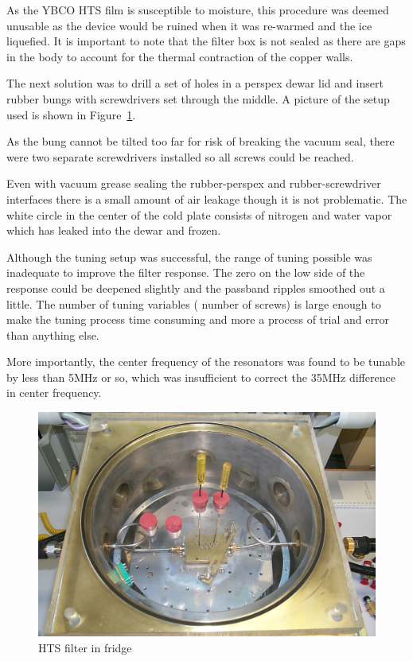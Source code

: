 As the YBCO HTS film is susceptible to moisture, this procedure was deemed unusable as the device would be ruined when it was re-warmed and the ice liquefied. It is important to note that the filter box is not sealed as there are gaps in the body to account for the thermal contraction of the copper walls.

The next solution was to drill a set of holes in a perspex dewar lid and insert rubber bungs with screwdrivers set through the middle. A picture of the setup used is shown in Figure~\ref{figure:test-hts-fridge}.

As the bung cannot be tilted too far for risk of breaking the vacuum seal, there were two separate screwdrivers installed so all screws could be reached.

Even with vacuum grease sealing the rubber-perspex and rubber-screwdriver interfaces there is a small amount of air leakage though it is not problematic. The white circle in the center of the cold plate consists of nitrogen and water vapor which has leaked into the dewar and frozen.

Although the tuning setup was successful, the range of tuning possible was inadequate to improve the filter response. The zero on the low side of the response could be deepened slightly and the passband ripples smoothed out a little. The number of tuning variables ( number of screws) is large enough to make the tuning process  time consuming and more a process of trial and error than anything else.

More importantly, the center frequency of the resonators was found to be tunable by less than 5MHz or so, which was insufficient to correct the 35MHz difference in center frequency.

\begin{figure}[ht]
\begin{center}
\includegraphics[scale=0.2]{fig/test-hts-fridge.jpg}
\end{center}
\vspace{-1em}
\caption{HTS filter in fridge}
\label{figure:test-hts-fridge}
\end{figure}

